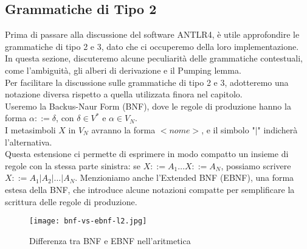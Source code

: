 \documentclass{article}
\begin{document}
\subsection{Grammatiche di Tipo 2}
Prima di passare alla discussione del software ANTLR4, è utile approfondire le grammatiche di tipo 2 e 3, dato che ci occuperemo della loro implementazione.\\
\noindent
In questa sezione, discuteremo alcune peculiarità delle grammatiche contestuali, come l'ambiguità, gli alberi di derivazione e il Pumping lemma.\\
\noindent
Per facilitare la discussione sulle grammatiche di tipo 2 e 3, adotteremo una notazione diversa rispetto a quella utilizzata finora nel capitolo.\\
\noindent Useremo la Backus-Naur Form (BNF), dove le regole di produzione hanno la forma \( \alpha ::= \delta \), con \( \delta \in V^* \) e \( \alpha \in V_N \).\\I metasimboli \( X \) in \( V_N \) avranno la forma $<nome>$, e il simbolo "$|$" indicherà l'alternativa.\\Questa estensione ci permette di esprimere in modo compatto un insieme di regole con la stessa parte sinistra: se \( X ::= A_1 \ldots X ::= A_N \), possiamo scrivere \( X ::= A_1 | A_2 | \ldots | A_N \).
\noindent
Menzioniamo anche l'Extended BNF (EBNF), una forma estesa della BNF, che introduce alcune notazioni compatte per semplificare la scrittura delle regole di produzione.
\begin{figure}[H]
    \centering
    \texttt{[image: bnf-vs-ebnf-l2.jpg]}
    \caption{Differenza tra BNF e EBNF nell'aritmetica}
    \label{fig:enter-label}
\end{figure}
\end{document}
